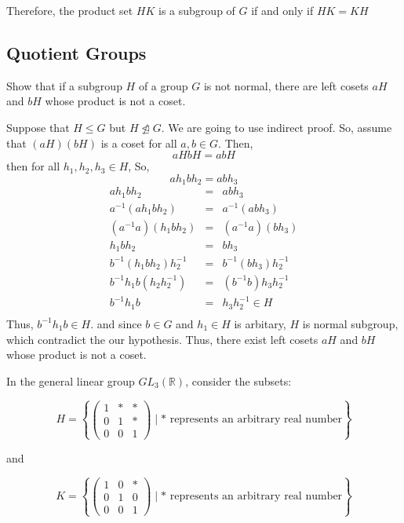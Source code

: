 \documentclass[
]{book}
\begin{document}
Therefore, the product set \(HK\) is a subgroup of \(G\) if and only if
\(HK = KH\)

\hypertarget{quotient-groups-1}{%
\subsection{Quotient Groups}\label{quotient-groups-1}}

\leavevmode{}%
Show that if a subgroup \(H\) of a group \(G\) is not normal, there are
left cosets \(aH\) and \(bH\) whose product is not a coset.

Suppose that \(H \leq G\) but \(H \not\trianglelefteq G\). We are going
to use indirect proof. So, assume that \((aH)(bH)\) is a coset for all
\(a,b\in G\). Then, \[aHbH=abH\] then for all \(h_1,h_2,h_3\in H\), So,
\[ah_1bh_2=abh_3\] \begin{eqnarray}
ah_1bh_2 &= & abh_3\\
a^{-1}(ah_1bh_2) &=& a^{-1}(abh_3)\\
(a^{-1}a)(h_1bh_2) &=& (a^{-1}a)(bh_3)\\
h_1bh_2 &=& bh_3\\
b^{-1}(h_1bh_2)h_2^{-1} &=& b^{-1}(bh_3)h_2^{-1}\\
b^{-1}h_1b(h_2h_2^{-1}) &=& (b^{-1}b)h_3h_2^{-1}\\
b^{-1}h_1b &=& h_3h_2^{-1}\in H\\
\end{eqnarray} Thus, \(b^{-1}h_1b\in H\). and since \(b\in G\) and
\(h_1\in H\) is arbitary, \(H\) is normal subgroup, which contradict the
our hypothesis. Thus, there exist left cosets \(aH\) and \(bH\) whose
product is not a coset.

\leavevmode{}%
In the general linear group \(GL_3(\mathbb{R})\), consider the subsets:

\[ H = \left\{ \begin{pmatrix} 1 & * & * \\ 0 & 1 & * \\ 0 & 0 & 1 \end{pmatrix} \mid * \text{ represents an arbitrary real number} \right\} \]

and

\[ K = \left\{ \begin{pmatrix} 1 & 0 & * \\ 0 & 1 & 0 \\ 0 & 0 & 1 \end{pmatrix} \mid * \text{ represents an arbitrary real number} \right\} \]
\end{document}
